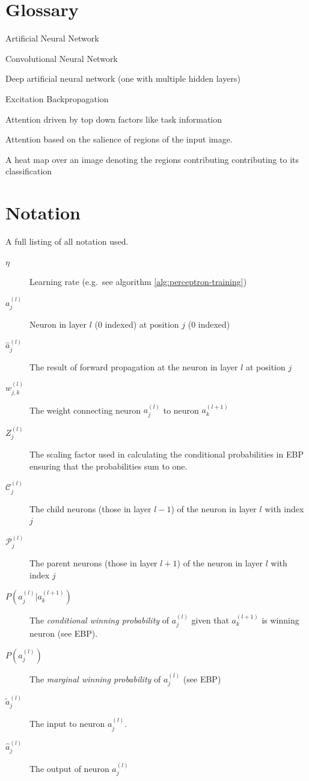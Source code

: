 \documentclass[A4paper,draft]{scrreprt}
\providecommand{\tightlist}{%
  \setlength{\itemsep}{0pt}\setlength{\parskip}{0pt}}
\newcommand{\learningrate}{\eta}
\newcommand{\neuron}[2]{a_{#2}^{(#1)}}
\newcommand{\neuronforward}[2]{\hat{a}_{#2}^{(#1)}}
\newcommand{\ebpscalar}[2]{Z_{#2}^{(#1)}}
\newcommand{\weight}[3]{w_{#2,#3}^{(#1)}}
\newcommand{\children}[2]{\mathscr{C}^{(#1)}_{#2}}
\newcommand{\parents}[2]{\mathscr{P}^{(#1)}_{#2}}
\newcommand{\cwp}[4]{P\left(\neuron{#1}{#2} | \neuron{#3}{#4}\right)}
\newcommand{\mwp}[2]{P\left(\neuron{#1}{#2}\right)}
\newcommand{\neuroninput}[2]{\tilde{a}^{(#1)}_{#2}}
\newcommand{\neuronoutput}[2]{\hat{a}^{(#1)}_{#2}}
\begin{document}
\chapter{Glossary}\label{glossary}

\begin{description}
\tightlist
\item[ANN]
Artificial Neural Network
\item[CNN]
Convolutional Neural Network
\item[DNN]
Deep artificial neural network (one with multiple hidden layers)
\item[EBP]
Excitation Backpropagation
\item[Top down attention]
Attention driven by top down factors like task information
\item[Bottom up attention]
Attention based on the salience of regions of the input image.
\item[Excitation Map]
A heat map over an image denoting the regions contributing contributing
to its classification
\end{description}

\chapter{Notation}\label{notation}

A full listing of all notation used.

\begin{description}
\item[\(\learningrate\)]
Learning rate (e.g.~see algorithm \ref{alg:perceptron-training})
\item[\(\neuron{l}{j}\)]
Neuron in layer \(l\) (0 indexed) at position \(j\) (0 indexed)
\item[\(\neuronforward{l}{j}\)]
The result of forward propagation at the neuron in layer \(l\) at
position \(j\)
\item[\(\weight{l}{j}{k}\)]
The weight connecting neuron \(\neuron{l}{j}\) to neuron
\(\neuron{l + 1}{k}\)
\item[\(\ebpscalar{l}{j}\)]
The scaling factor used in calculating the conditional probabilities in
EBP ensuring that the probabilities sum to one.
\item[\(\children{l}{j}\)]
The child neurons (those in layer \(l - 1\)) of the neuron in layer
\(l\) with index \(j\)
\item[\(\parents{l}{j}\)]
The parent neurons (those in layer \(l + 1\)) of the neuron in layer
\(l\) with index \(j\)
\item[\(\cwp{l}{j}{l + 1}{k}\)]
The \emph{conditional winning probability} of \(\neuron{l}{j}\) given
that \(\neuron{l + 1}{k}\) is winning neuron (see EBP).
\item[\(\mwp{l}{j}\)]
The \emph{marginal winning probability} of \(\neuron{l}{j}\) (see EBP)
\item[\(\neuroninput{l}{j}\)]
The input to neuron \(\neuron{l}{j}\).
\item[\(\neuronoutput{l}{j}\)]
The output of neuron \(\neuron{l}{j}\)
\end{description}
\end{document}
